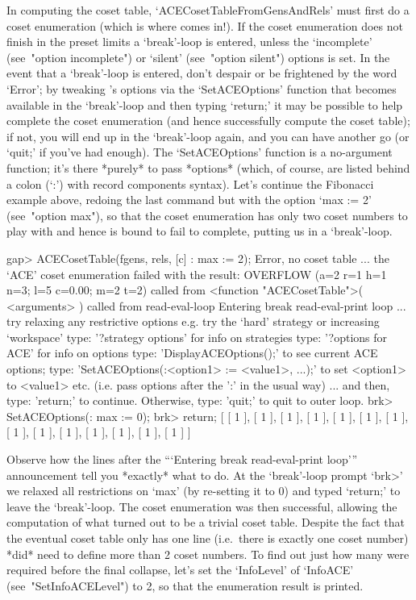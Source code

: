 \endexample

In computing  the  coset  table,  `ACECosetTableFromGensAndRels'  must
first do a coset enumeration (which is where {\ACE} comes in!). If the
coset enumeration does not finish in the preset limits a  `break'-loop
is entered,  unless  the  `incomplete'  (see~"option  incomplete")  or
`silent' (see~"option silent") options is set. In  the  event  that  a
`break'-loop is entered, don't despair or be frightened  by  the  word
`Error'; by tweaking {\ACE}'s options via the `SetACEOptions' function
that becomes available in the `break'-loop and then  typing  `return;'
it may be possible to help {\ACE} complete the coset enumeration  (and
hence successfully compute the coset table); if not, you will  end  up
in the `break'-loop again, and you can have another go (or `quit;'  if
you've had enough). The  `SetACEOptions'  function  is  a  no-argument
function; it's there *purely* to pass *options* (which, of course, are
listed behind a colon (`:')  with  record  components  syntax).  Let's
continue the Fibonacci example above, redoing  the  last  command  but
with the option `max := 2'  (see~"option  max"),  so  that  the  coset
enumeration has only two coset numbers to play with and hence is bound
to fail to complete, putting us in a `break'-loop.

\beginexample
gap> ACECosetTable(fgens, rels, [c] : max := 2);
Error, no coset table ...
 the `ACE' coset enumeration failed with the result:
 OVERFLOW (a=2 r=1 h=1 n=3; l=5 c=0.00; m=2 t=2)
 called from
<function "ACECosetTable">( <arguments> ) called from read-eval-loop
Entering break read-eval-print loop ...
 try relaxing any restrictive options
 e.g. try the `hard' strategy or increasing `workspace'
 type: '?strategy options' for info on strategies
 type: '?options for ACE' for info on options
 type: 'DisplayACEOptions();' to see current ACE options;
 type: 'SetACEOptions(:<option1> := <value1>, ...);'
 to set <option1> to <value1> etc.
 (i.e. pass options after the ':' in the usual way)
 ... and then, type: 'return;' to continue.
 Otherwise, type: 'quit;' to quit to outer loop.
brk> SetACEOptions(: max := 0);
brk> return;
[ [ 1 ], [ 1 ], [ 1 ], [ 1 ], [ 1 ], [ 1 ], [ 1 ], [ 1 ], [ 1 ], [ 1 ], 
  [ 1 ], [ 1 ], [ 1 ], [ 1 ] ]

\endexample

Observe how the lines  after  the  ```Entering  break  read-eval-print
loop''' announcement tell you *exactly* what to  do. At  the  
`break'-loop  prompt  `brk>'  we  relaxed  all
restrictions on `max' (by re-setting it to 0) and typed  `return;'  to
leave the `break'-loop. The coset  enumeration  was  then  successful,
allowing the computation of what turned out  to  be  a  trivial  coset
table. Despite the fact that the eventual coset  table  only  has  one
line (i.e.~there is exactly one coset number)  {\ACE}  *did*  need  to
define more than 2 coset numbers. To  find  out  just  how  many  were
required before the final  collapse,  let's  set  the  `InfoLevel'  of
`InfoACE' (see~"SetInfoACELevel") to 2, so that the {\ACE} enumeration
result is printed.

